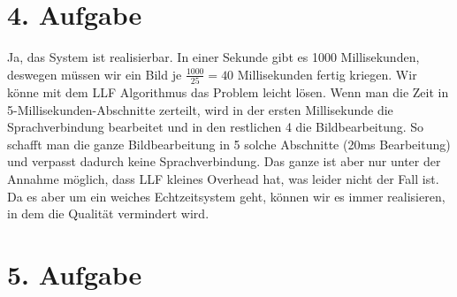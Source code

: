 \section*{4. Aufgabe}
Ja, das System ist realisierbar. In einer Sekunde gibt es 1000 Millisekunden, deswegen müssen wir ein Bild je $\frac{1000}{25} = 40$ Millisekunden fertig kriegen. Wir könne mit dem LLF Algorithmus das Problem leicht lösen. Wenn man die Zeit in 5-Millisekunden-Abschnitte zerteilt, wird in der ersten Millisekunde die Sprachverbindung bearbeitet und in den restlichen 4 die Bildbearbeitung. So schafft man die ganze Bildbearbeitung in 5 solche Abschnitte (20ms Bearbeitung) und verpasst dadurch keine Sprachverbindung. Das ganze ist aber nur unter der Annahme möglich, dass LLF kleines Overhead hat, was leider nicht der Fall ist. Da es aber um ein weiches Echtzeitsystem geht, können wir es immer realisieren, in dem die Qualität vermindert wird.

\section*{5. Aufgabe}

